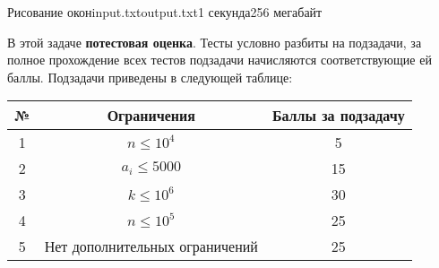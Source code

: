 \begin{problem}{Рисование окон}{input.txt}{output.txt}{1 секунда}{256 мегабайт}
\Examples

\begin{example}
%
%
%
\end{example}

\Scoring

В этой задаче \textbf{потестовая оценка}. Тесты условно разбиты на подзадачи, за полное прохождение всех тестов подзадачи начисляются соответствующие ей баллы. Подзадачи приведены в следующей таблице:

\medskip

\begin{tabular}{| c | c | c |} \hline
	№ & Ограничения & Баллы за подзадачу \\ \hline
	1 & $n \le 10^4$ & 5 \\ \hline
	2 & $a_i \le 5000$ & 15 \\ \hline
	3 & $k \le 10^6$ & 30 \\ \hline
	4 & $n \le 10^5$ & 25 \\ \hline
	5 & Нет дополнительных ограничений & 25 \\ \hline
\end{tabular}

\end{problem}

